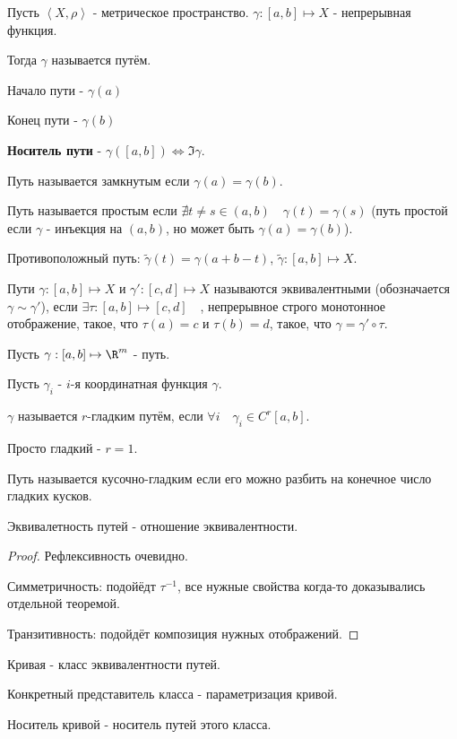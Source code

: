 
\begin{definition} \thmslashn 

    Пусть $\left<X, \rho\right>$ - метрическое пространство. $\gamma : [a, b] \mapsto X$ - непрерывная функция.

    Тогда $\gamma$ называется путём.

    Начало пути - $\gamma(a)$

    Конец пути - $\gamma(b)$

    \textbf{Носитель пути} - $\gamma([a, b]) \iff \Im \gamma$.

    Путь называется замкнутым если $\gamma(a) = \gamma(b)$.

    Путь называется простым если $\nexists{t \neq s\in (a, b)}\quad \gamma(t) = \gamma(s)$ (путь простой если $\gamma$ - инъекция на $(a, b)$, но может быть $\gamma(a) = \gamma(b)$).

    Противоположный путь: $\tilde{\gamma}(t) = \gamma(a + b - t)$, $\tilde{\gamma} : [a, b] \mapsto X$.

    Пути $\gamma : [a, b] \mapsto X$ и $\gamma' : [c, d] \mapsto X$ называются эквивалентными (обозначается $\gamma \sim \gamma'$), если $\exists{\tau : [a, b] \mapsto [c, d]}\quad$, непрерывное строго монотонное отображение, такое, что $\tau(a) = c$ и $\tau(b) = d$, такое, что $\gamma = \gamma' \circ \tau$. 
\end{definition}
\begin{definition} \thmslashn 

    Пусть $\gamma : [a, b] \mapsto \R^{m}$ - путь.

    Пусть $\gamma_{i} $ - $i$-я координатная функция $\gamma$.

    $\gamma$ называется $r$-гладким путём, если $\forall{i}\quad \gamma_{i}\in C^{r}[a, b]$.

    Просто гладкий - $r = 1$.
\end{definition}
\begin{definition} \thmslashn 

    Путь называется кусочно-гладким если его можно разбить на конечное число гладких кусков.
\end{definition}
\begin{remark} \thmslashn

    Эквивалетность путей - отношение эквивалентности.

    \begin{proof} \thmslashn
    
        Рефлексивность очевидно.

        Симметричность: подойёдт $\tau^{-1}$, все нужные свойства когда-то доказывались отдельной теоремой.

        Транзитивность: подойдёт композиция нужных отображений.
    \end{proof}
\end{remark}

\begin{definition} \thmslashn 

    Кривая - класс эквивалентности путей.

    Конкретный представитель класса - параметризация кривой.

    Носитель кривой - носитель путей этого класса.
\end{definition}
